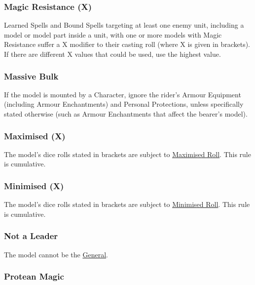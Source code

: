 \subsubsection{Magic Resistance (X)}
\idx[main=y]{\magicresistance{}}\label{magic_resistance}

Learned Spells and Bound Spells targeting at least one enemy unit, including a model or model part inside a unit, with one or more models with Magic Resistance suffer a \minuss{}X modifier to their casting roll (where X is given in brackets). If there are different X values that could be used, use the highest value.

\subsubsection{Massive Bulk}
\idx[main=y]{\massivebulk}\label{massive_bulk}

If the model is mounted by a Character, ignore the rider's Armour Equipment (including Armour Enchantments) and Personal Protections, unless specifically stated otherwise (such as Armour Enchantments that affect the bearer's model).

\subsubsection{Maximised (X)}
\label{maximised}

The model's dice rolls stated in brackets are subject to \hyperref[maximised_roll]{Maximised Roll}. This rule is cumulative.

\subsubsection{Minimised (X)}
\label{minimised}

The model's dice rolls stated in brackets are subject to \hyperref[maximised_roll]{Minimised Roll}. This rule is cumulative.

\subsubsection{Not a Leader}
\idx[main=y]{\notaleader}\label{not_a_leader}

The model cannot be the \hyperref[the_general]{General}.

\subsubsection{Protean Magic}
\idx[main=y]{\proteanmagic}\label{protean_magic}

